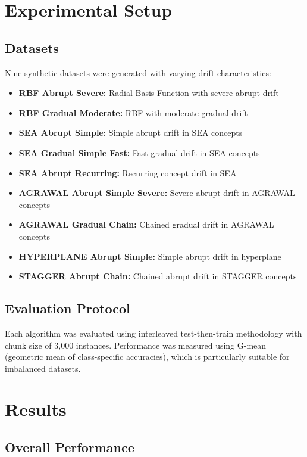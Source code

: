\documentclass[conference]{IEEEtran}
\begin{document}
\section{Experimental Setup}

\subsection{Datasets}

Nine synthetic datasets were generated with varying drift characteristics:

\begin{itemize}
\item \textbf{RBF Abrupt Severe:} Radial Basis Function with severe abrupt drift
\item \textbf{RBF Gradual Moderate:} RBF with moderate gradual drift
\item \textbf{SEA Abrupt Simple:} Simple abrupt drift in SEA concepts
\item \textbf{SEA Gradual Simple Fast:} Fast gradual drift in SEA concepts
\item \textbf{SEA Abrupt Recurring:} Recurring concept drift in SEA
\item \textbf{AGRAWAL Abrupt Simple Severe:} Severe abrupt drift in AGRAWAL concepts
\item \textbf{AGRAWAL Gradual Chain:} Chained gradual drift in AGRAWAL concepts
\item \textbf{HYPERPLANE Abrupt Simple:} Simple abrupt drift in hyperplane
\item \textbf{STAGGER Abrupt Chain:} Chained abrupt drift in STAGGER concepts
\end{itemize}

\subsection{Evaluation Protocol}

Each algorithm was evaluated using interleaved test-then-train methodology with chunk size of 3,000 instances. Performance was measured using G-mean (geometric mean of class-specific accuracies), which is particularly suitable for imbalanced datasets.

\section{Results}

\subsection{Overall Performance}
\end{document}
